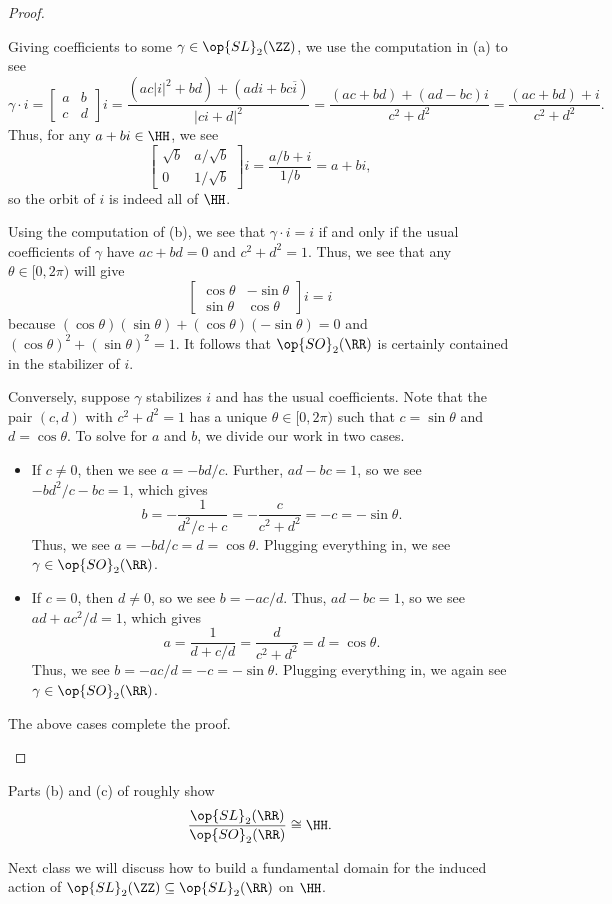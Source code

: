 \documentclass[../notes.tex]{subfiles}
\begin{document}
\begin{proof}
\begin{listalph}
		\item Giving coefficients to some $\gamma\in\op{SL}_2(\ZZ)$, we use the computation in (a) to see
		\[\gamma\cdot i=\begin{bmatrix}
			a & b \\
			c & d
		\end{bmatrix}i=\frac{\left(ac|i|^2+bd\right)+(adi+bc\overline i)}{|ci+d|^2}=\frac{(ac+bd)+(ad-bc)i}{c^2+d^2}=\frac{(ac+bd)+i}{c^2+d^2}.\]
		Thus, for any $a+bi\in\HH$, we see
		\[\begin{bmatrix}
			\sqrt b & a/\sqrt b \\
			0 & 1/\sqrt b
		\end{bmatrix}i=\frac{a/b+i}{1/b}=a+bi,\]
		so the orbit of $i$ is indeed all of $\HH$.

		\item Using the computation of (b), we see that $\gamma\cdot i=i$ if and only if the usual coefficients of $\gamma$ have $ac+bd=0$ and $c^2+d^2=1$. Thus, we see that any $\theta\in[0,2\pi)$ will give
		\[\begin{bmatrix}
			\cos\theta & -\sin\theta \\
			\sin\theta & \cos\theta
		\end{bmatrix}i=i\]
		because $(\cos\theta)(\sin\theta)+(\cos\theta)(-\sin\theta)=0$ and $(\cos\theta)^2+(\sin\theta)^2=1$. It follows that $\op{SO}_2(\RR)$ is certainly contained in the stabilizer of $i$.

		Conversely, suppose $\gamma$ stabilizes $i$ and has the usual coefficients. Note that the pair $(c,d)$ with $c^2+d^2=1$ has a unique $\theta\in[0,2\pi)$ such that $c=\sin\theta$ and $d=\cos\theta$. To solve for $a$ and $b$, we divide our work in two cases.
		\begin{itemize}
			\item If $c\ne0$, then we see $a=-bd/c$. Further, $ad-bc=1$, so we see $-bd^2/c-bc=1$, which gives
			\[b=-\frac1{d^2/c+c}=-\frac c{c^2+d^2}=-c=-\sin\theta.\]
			Thus, we see $a=-bd/c=d=\cos\theta$. Plugging everything in, we see $\gamma\in\op{SO}_2(\RR)$.
			\item If $c=0$, then $d\ne0$, so we see $b=-ac/d$. Thus, $ad-bc=1$, so we see $ad+ac^2/d=1$, which gives
			\[a=\frac1{d+c/d}=\frac d{c^2+d^2}=d=\cos\theta.\]
			Thus, we see $b=-ac/d=-c=-\sin\theta$. Plugging everything in, we again see $\gamma\in\op{SO}_2(\RR)$.
		\end{itemize}
		The above cases complete the proof.
		\qedhere
	\end{listalph}
\end{proof}
\begin{remark} \label{rem:h-as-quotient}
	Parts (b) and (c) of  roughly show
	\[\frac{\op{SL}_2(\RR)}{\op{SO}_2(\RR)}\cong\HH.\]
\end{remark}
Next class we will discuss how to build a fundamental domain for the induced action of $\op{SL}_2(\ZZ)\subseteq\op{SL}_2(\RR)$ on $\HH$.
\end{document}
